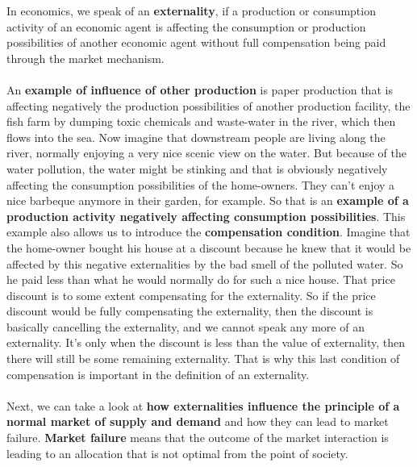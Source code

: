 \documentclass[../summary.tex]{subfiles}
\begin{document}
	  In economics, we speak of an \textbf{externality}, if a production or consumption activity of an economic agent is affecting the consumption or production possibilities of another economic agent without full compensation being paid through the market mechanism. 
	  \\\\
	  An \textbf{example of influence of other production} is paper production that is affecting negatively the production possibilities of another production facility, the fish farm by dumping toxic chemicals and waste-water in the river, which then flows into the sea. Now imagine that downstream people are living along the river, normally enjoying a very nice scenic view on the water. But because of the water pollution, the water might be stinking and that is obviously negatively affecting the consumption possibilities of the home-owners. They can't enjoy a nice barbeque anymore in their garden, for example. So that is an \textbf{example of a production activity negatively affecting consumption possibilities}. This example also allows us to introduce the \textbf{compensation condition}.  Imagine that the home-owner bought his house at a discount because he knew that it would be affected by this negative externalities by the bad smell of the polluted water. So he paid less than what he would normally do for such a nice house. That price discount is to some extent compensating for the externality. So if the price discount would be fully compensating the externality, then the discount is basically cancelling the externality, and we cannot speak any more of an externality. It's only when the discount is less than the value of externality, then there will still be some remaining externality. That is why this last condition of compensation is important in the definition of an externality.
	  \\\\
	  Next, we can take a look at \textbf{how externalities influence the principle of a normal market of supply and demand} and how they can lead to market failure. \textbf{Market failure} means that the outcome of the market interaction is leading to an allocation that is not optimal from the point of society.
	  \\\\
\end{document}
